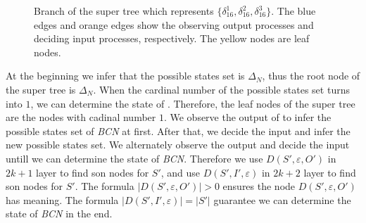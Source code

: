   \begin{figure}[thpb]
      \centering
      
      \caption{Branch of the super tree which represents $\{\delta_{16}^1,\delta_{16}^2,\delta_{16}^3\}$. The blue edges and orange edges show the observing output processes and deciding input processes, respectively. The yellow nodes are leaf nodes.}
      \label{fig:3}
   \end{figure}

At the beginning we infer that the possible states set is $\Delta_N$, thus the root node of the super tree is $\Delta_N$. When the cardinal number of the possible states set turns into $1$, we can determine the state of {\BCN}. Therefore, the leaf nodes of the super tree are the nodes with cadinal number $1$. We observe the output of {\BCN} to infer the possible states set of {\em BCN} at first. After that, we decide the input and infer the new possible states set. We alternately observe the output and decide the input untill we can determine the state of {\em BCN}. Therefore we use $D\left(S',\varepsilon, O'\right)$ in $2k+1$ layer to find son nodes for $S'$, and use $D\left(S',I',\varepsilon\right)$ in $2k+2$ layer to find son nodes for $S'$. The formula $|D\left(S',\varepsilon, O'\right)|>0$ ensures the node $D\left(S',\varepsilon, O'\right)$ has meaning. The formula $|D\left(S',I',\varepsilon\right)|=|S'|$ guarantee we can determine the state of {\em BCN} in the end. 

